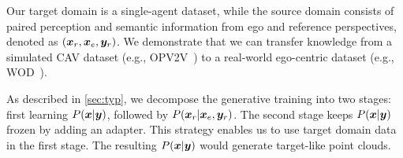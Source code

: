  Our target domain is a single-agent dataset, while the source domain consists of paired perception and semantic information from ego and reference perspectives, denoted as $({\bm{x}}_r, {\bm{x}}_e, {\bm{y}}_r)$. We demonstrate that we can transfer knowledge from a simulated CAV dataset (e.g., OPV2V~\cite{xu2022opv2v}) to a real-world ego-centric dataset (e.g., WOD~\citep{sun2020waymo}).

 As described in \cref{sec:typ}, we decompose the generative training into two stages: first learning $P({\bm{x}}|{\bm{y}})$, followed by $P({\bm{x}}_r|{\bm{x}}_e, {\bm{y}}_r)$. The second stage keeps $P({\bm{x}}|{\bm{y}})$ frozen by adding an adapter. This strategy enables us to use target domain data in the first stage. The resulting $P({\bm{x}}|{\bm{y}})$ would generate target-like point clouds.

